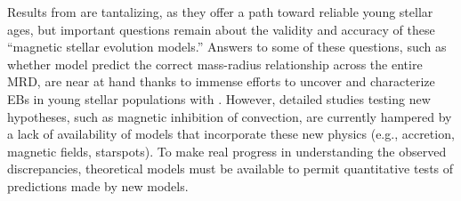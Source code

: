 

Results from \citet{Feiden2016} are tantalizing, as they offer a path toward reliable young stellar ages, but important questions remain about the validity and accuracy of these ``magnetic stellar evolution models.'' Answers to some of these questions, such as whether model predict the correct mass-radius relationship across the entire MRD, are near at hand thanks to immense efforts to uncover and characterize EBs in young stellar populations with \kepler. However, detailed studies testing new hypotheses, such as magnetic inhibition of convection, are currently hampered by a lack of availability of models that incorporate these new physics (e.g., accretion, magnetic fields, starspots). To make real progress in understanding the observed discrepancies, theoretical models must be available to permit quantitative tests of predictions made by new models. \\


 

